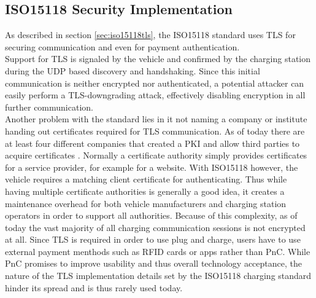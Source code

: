 \documentclass[conference,flushend]{iaria} %
\begin{document}
\subsection{ISO15118 Security Implementation}
As described in section \ref{sec:iso15118tls}, the ISO15118 standard uses TLS for securing communication and even for payment authentication. \\
Support for TLS is signaled by the vehicle and confirmed by the charging station during the UDP based discovery and handshaking.
Since this initial communication is neither encrypted nor authenticated, a potential attacker can easily perform a TLS-downgrading attack, effectively disabling encryption in all further communication. \\
Another problem with the standard lies in it not naming a company or institute handing out certificates required for TLS communication.
As of today there are at least four different companies that created a PKI and allow third parties to acquire certificates \cite{charin_charin_nodate, hubject_download_nodate, nexusgroup_identities_nodate, irdeto_irdeto_nodate}.
Normally a certificate authority simply provides certificates for a service provider, for example for a website.
With ISO15118 however, the vehicle requires a matching client certificate for authenticating.
Thus while having multiple certificate authorities is generally a good idea, it creates a maintenance overhead for both vehicle manufacturers and charging station operators in order to support all authorities.
Because of this complexity, as of today the vast majority of all charging communication sessions is not encrypted at all.
Since TLS is required in order to use plug and charge, users have to use external payment menthods such as RFID cards or apps rather than PnC.
While PnC promises to improve usability and thus overall technology acceptance, the nature of the TLS implementation details set by the ISO15118 charging standard hinder its spread and is thus rarely used today.
\end{document}
